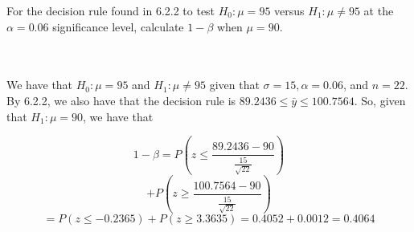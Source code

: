 For the decision rule found in 6.2.2 to test $H_0:\mu=95$ versus $H_1:\mu\neq95$ at the $\alpha=0.06$
significance level, calculate $1-\beta$ when $\mu=90$.\\\\

\begin{solution}\renewcommand{\qedsymbol}{}\ \\
    We have that $H_0:\mu=95$ and $H_1:\mu\neq95$ given that $\sigma=15, \alpha=0.06$, and $n=22$.
    By 6.2.2, we also have that the decision rule is $89.2436\leq\bar{y}\leq100.7564$. So, given that
    $H_1:\mu=90$, we have that
    
    $$1-\beta=P(z\leq\frac{89.2436-90}{\frac{15}{\sqrt{22}}})$$
    $$+P(z\geq\frac{100.7564-90}{\frac{15}{\sqrt{22}}})$$
    $$=P(z\leq-0.2365)+P(z\geq3.3635)=0.4052+0.0012=0.4064$$

\end{solution}